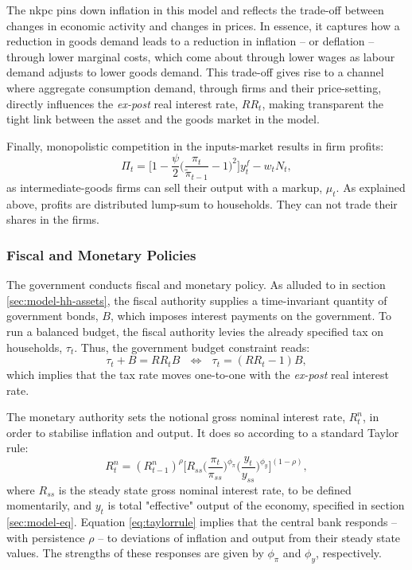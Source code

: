 \documentclass[a4paper,12pt]{article} %
\numberwithin{equation}{section} %
\numberwithin{figure}{section}
\numberwithin{table}{section}
\begin{document}
The \Gls{nkpc} pins down inflation in this model and reflects the trade-off between changes in economic activity and changes in prices. In essence, it captures how a reduction in goods demand leads to a reduction in inflation -- or deflation -- through lower marginal costs, which come about through lower wages as labour demand adjusts to lower goods demand. This trade-off gives rise to a channel where aggregate consumption demand, through firms and their price-setting, directly influences the \textit{ex-post} real interest rate, $RR_t$, making transparent the tight link between the asset and the goods market in the model.

Finally, monopolistic competition in the inputs-market results in firm profits:
\begin{equation}
    \Pi_t = \Bigg[ 1 - \frac{\psi}{2} \Bigg( \frac{\pi_t}{\tilde{\pi}_{t-1}} - 1 \Bigg)^2 \Bigg] y_t^f - w_t N_t, \label{eq:firms-profits}
\end{equation}
as intermediate-goods firms can sell their output with a markup, $\mu_t$. As explained above, profits are distributed lump-sum to households. They can not trade their shares in the firms.

\subsubsection{Fiscal and Monetary Policies}
\label{sec:model-policy}

The government conducts fiscal and monetary policy. As alluded to in section \ref{sec:model-hh-assets}, the fiscal authority supplies a time-invariant quantity of government bonds, $B$, which imposes interest payments on the government. To run a balanced budget, the fiscal authority levies the already specified tax on households, $\tau_t$. Thus, the government budget constraint reads:
\begin{equation}
    \tau_t + B = RR_t B \ \ \ \Leftrightarrow \ \ \ \tau_t = (RR_t - 1)B, \label{eq:fiscal-budget}
\end{equation}
which implies that the tax rate moves one-to-one with the \textit{ex-post} real interest rate.

The monetary authority sets the notional gross nominal interest rate, $R_{t}^n$, in order to stabilise inflation and output. It does so according to a standard Taylor rule:
\begin{equation}
    R_{t}^n = ( R_{t-1}^n )^{\rho} \Bigg[ R_{ss} \Bigg( \frac{\pi_t}{\pi_{ss}} \Bigg)^{\phi_{\pi}} \Bigg( \frac{y_t}{y_{ss}} \Bigg)^{\phi_y} \Bigg]^{(1-\rho)}, \label{eq:taylorrule}
\end{equation}
where $R_{ss}$ is the steady state gross nominal interest rate, to be defined momentarily, and $y_t$ is total "effective" output of the economy, specified in section \ref{sec:model-eq}. Equation \eqref{eq:taylorrule} implies that the central bank responds -- with persistence $\rho$ -- to deviations of inflation and output from their steady state values. The strengths of these responses are given by $\phi_{\pi}$ and $\phi_y$, respectively. 
\end{document}
